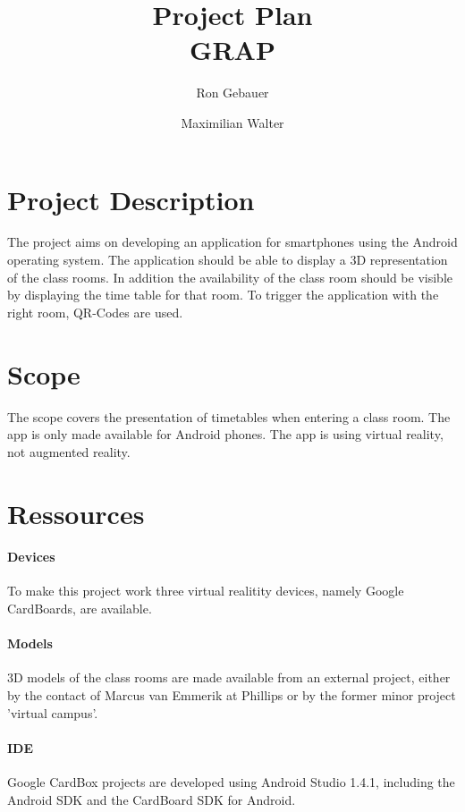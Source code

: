 \documentclass[]{report}
\title{Project Plan \\GRAP}
\author{Ron Gebauer \and Maximilian Walter}
\begin{document}
\maketitle
\section{Project Description}
The project aims on developing an application for smartphones using the Android operating system. The application should be able to display a 3D representation of the class rooms. In addition the availability of the class room should be visible by displaying the time table for that room. To trigger the application with the right room, QR-Codes are used. \\
\section{Scope}
The scope covers the presentation of timetables when entering a class room. The app is only made available for Android phones. The app is using virtual reality, not augmented reality. 
\section{Ressources}

\paragraph{Devices}
To make this project work three virtual realitity devices, namely Google CardBoards, are available. 
\paragraph{Models}
3D models of the class rooms are made available from an external project, either by the contact of Marcus van Emmerik at Phillips or by the former minor project 'virtual campus'. 
\paragraph{IDE}
Google CardBox projects are developed using Android Studio 1.4.1, including the Android SDK and the CardBoard SDK for Android.
\end{document}

